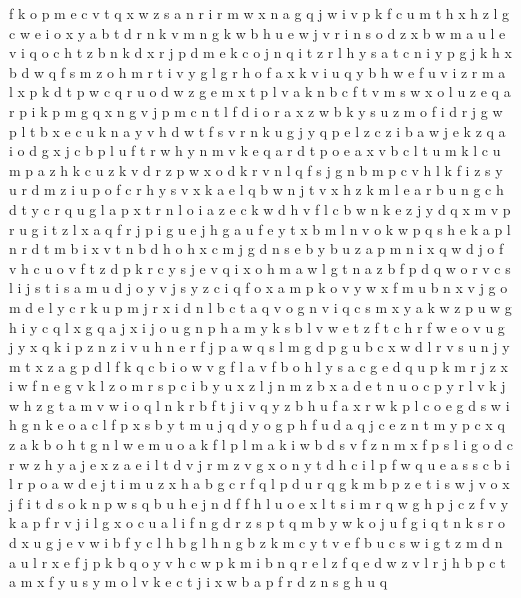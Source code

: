 \documentclass{article}
\begin{document}
f k o p m e c v t q x w z s a n r i
r m w x n a g
q j w i v p k f c u m t h x
h z l g c w e i o x y a b t d r n k v m
n
g k w b h u e
w j v r i n s o d z x b
w m a u l e v i q o c h t z b n k d x r j p
d m e k c o j n q i t z r l h y s
a t c n i y p g j k h x b d w q f s m z o
h m r t i v y g
l g r h o f a x k v i u
q y b h w e f u v i z r m a l x p k d t
p w
c q r u o d w z g e m x t p l v a k n
b c f t v m s w x o l u z e q a r p i k
p m g q x n
g v j p m c n t l f d i o r a x z w b k y s u
z m o f i d r j g w p l t b x e c u k n a y v
h d w t f s v r n k u g j y q p e l z
c z i b a w j
e k z q a i o d g x j c b p l u f t r w h y n m v
k e q a
r d t p o e a x v b c l
t u m k l c
u m p a z h k c
u z k v d r
z p w x o d k r v n l q f s
j g n b m p c v h l k f i z s y u r
d m z i u p o f c r h y s v x k a e l q b w n j t
v x h z k m l e a r b u n g c
h d t y c r q u g l a p x
t r n l o i a z e c k w d h v f
l c b w n k e z j y d q x m v p r u g i
t z l x a q f r j p i g u e
j h g a u f e y t x b m l n v o k w p q s
h e k a p l n r d t m b i x v
t n b d h
o h x c m j g d n s e b
y b u z a p m n i x q w d j o f v h c
u o v
f t z d p k r c y s j e v q i x o h m a w l g
t n a z b f p d q w o r v c s
l i j s t
i s a m u d j
o y v
j s y
z c i q f o x a m p
k o v y w x f m u b n
x v j g o m d e l y c r
k u p m j r x i d n l b c t a q v
o g n v i q c s m x y a k w z p
u w g h i y c q l
x g q a j
x i j o u g n p h a m y k s b l v w e t z f
t c h r f w e o v u g j y x q k i p z n
z i v u h n e r f j p a w q s l m g d
p g u b c x w d l
r v s u n j y m t x z a g p d l f k q c b i o w
v g f l a
v f b o h l y s a c g e d q u p k m r j z
x i w f n e g v k l z o m r s p c
i b y u x z l j n
m z b x a d e t n u o c p y r l v k j w h
z g t a m v w i o q l n k r b f
t j i v q y z b h u f a x r w k p l c o e g d s
w i h g n k e o a c l f p x s b y t m u j q d
y o g p h f u d a q j c e z n t m
y p c x q z a k b o h t g n l w e m u
o a k f l p
l m a k i w b d s v f z
n m x f p s l i g o d c r w z h y a j e
x z a e i l t d v
j r m z v g x o n y t d h c i l p f w q u e a s
s c b i l r p o a w
d e j t i m u z x h a b g c r f q l p
d u r q g k m b p z e t i s w j v o x
j f i t d s o k n p
w
s q b u h e j n d f
f h l
u o e x l t s i m r q w g h p j c z f v y k a
p f r v j i l g
x o c u a l i f n g d r z s p t q m b y w k
o j u f g i
q t n k s r o d x u g j e v w i b f y c l h
b g l
h n g b z k m c y t v
e f b u c
s w i g t z m d n a u l r x e f j p k b q o y v h c
w p k m i b n q r e l z f
q e d w z v l r j h b p c t a m x f y u s
y m o l v k e c t j i x w b a p f r d z n s g h u q
\end{document}

